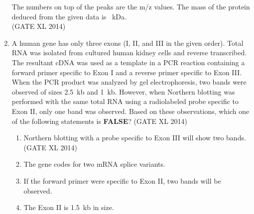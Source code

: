 \documentclass[journal,12pt,onecolumn]{IEEEtran}
\theoremstyle{remark}
\begin{document}
\begin{enumerate}
The numbers on top of the peaks are the m/z values. The mass of the protein deduced from the given data is \underline{\hspace{2cm}}~kDa.\\
\hfill (GATE XL 2014)\\
\item A human gene has only three exons (I, II, and III in the given order). Total RNA was isolated from cultured human kidney cells and reverse transcribed. The resultant cDNA was used as a template in a PCR reaction containing a forward primer specific to Exon I and a reverse primer specific to Exon III. When the PCR product was analyzed by gel electrophoresis, two bands were observed of sizes 2.5~kb and 1~kb. However, when Northern blotting was performed with the same total RNA using a radiolabeled probe specific to Exon II, only one band was observed. Based on these observations, which one of the following statements is \textbf{FALSE}?
\hfill (GATE XL 2014)\\
\begin{enumerate}
\item Northern blotting with a probe specific to Exon III will show two bands.
\hfill (GATE XL 2014)\\
\item The gene codes for two mRNA splice variants.
\item If the forward primer were specific to Exon II, two bands will be observed.
\item The Exon II is 1.5~kb in size.
\end{enumerate}


\end{enumerate}
\end{document}
